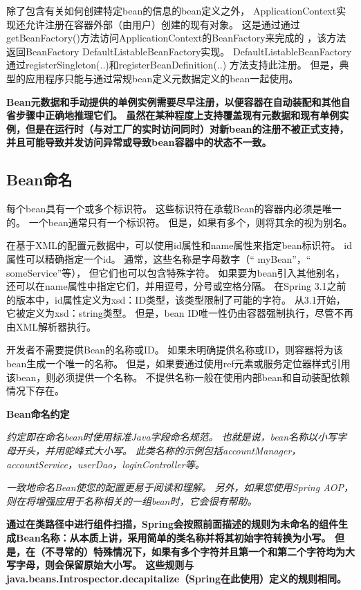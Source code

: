 除了包含有关如何创建特定bean的信息的bean定义之外，
ApplicationContext实现还允许注册在容器外部（由用户）创建的现有对象。
这是通过通过getBeanFactory()方法访问ApplicationContext的BeanFactory来完成的
，该方法返回BeanFactory DefaultListableBeanFactory实现。
DefaultListableBeanFactory通过registerSingleton(..)和registerBeanDefinition(..)
方法支持此注册。 但是，典型的应用程序只能与通过常规bean定义元数据定义的bean一起使用。

\textbf{Bean元数据和手动提供的单例实例需要尽早注册，以便容器在自动装配和其他自省步骤中正确地推理它们。 虽然在某种程度上支持覆盖现有元数据和现有单例实例，但是在运行时（与对工厂的实时访问同时）对新bean的注册不被正式支持，并且可能导致并发访问异常或导致bean容器中的状态不一致。}

\subsection{Bean命名}

每个bean具有一个或多个标识符。 这些标识符在承载Bean的容器内必须是唯一的。 
一个bean通常只有一个标识符。 
但是，如果有多个，则将其余的视为别名。

在基于XML的配置元数据中，可以使用id属性和name属性来指定bean标识符。
id属性可以精确指定一个id。 
通常，这些名称是字母数字（“ myBean”，“ someService”等），
但它们也可以包含特殊字符。 如果要为bean引入其他别名，
还可以在name属性中指定它们，并用逗号，分号或空格分隔。 
在Spring 3.1之前的版本中，id属性定义为xsd：ID类型，该类型限制了可能的字符。
从3.1开始，它被定义为xsd：string类型。 
但是，bean ID唯一性仍由容器强制执行，尽管不再由XML解析器执行。

开发者不需要提供Bean的名称或ID。 
如果未明确提供名称或ID，则容器将为该bean生成一个唯一的名称。 
但是，如果要通过使用ref元素或服务定位器样式引用该bean，则必须提供一个名称。
不提供名称一般在使用内部bean和自动装配依赖情况下存在。

\begin{center}
    \textbf{Bean命名约定}
\end{center}

\textit{约定即在命名bean时使用标准Java字段命名规范。 也就是说，bean名称以小写字母开头，并用驼峰式大小写。 此类名称的示例包括accountManager，accountService，userDao，loginController等。}

\textit{一致地命名Bean使您的配置更易于阅读和理解。 另外，如果您使用Spring AOP，则在将增强应用于名称相关的一组bean时，它会很有帮助。}

\textbf{通过在类路径中进行组件扫描，Spring会按照前面描述的规则为未命名的组件生成Bean名称：从本质上讲，采用简单的类名称并将其初始字符转换为小写。 但是，在（不寻常的）特殊情况下，如果有多个字符并且第一个和第二个字符均为大写字母，则会保留原始大小写。 这些规则与java.beans.Introspector.decapitalize（Spring在此使用）定义的规则相同。}


